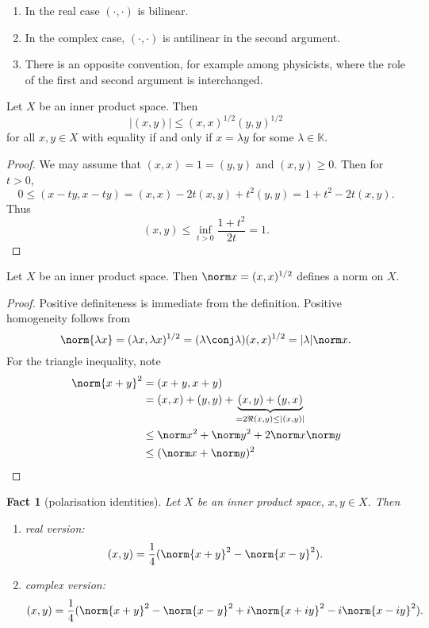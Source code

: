 \documentclass[a4paper]{article}
\newtheorem*{fact}{Fact}
\newcommand{\K}{{\mathbb{K}}} %
\begin{document}
\begin{remark}\leavevmode
  \begin{enumerate}
  \item In the real case \((\cdot, \cdot)\) is bilinear.
  \item In the complex case, \((\cdot, \cdot)\) is antilinear in the second argument.
  \item There is an opposite convention, for example among physicists, where the role of the first and second argument is interchanged.
  \end{enumerate}
\end{remark}

\begin{proposition}
  Let \(X\) be an inner product space. Then
  \[
    |(x, y)| \leq (x, x)^{1/2} (y, y)^{1/2}
  \]
  for all \(x, y \in X\) with equality if and only if \(x = \lambda y\) for some \(\lambda \in \K\).
\end{proposition}

\begin{proof}
  We may assume that \((x, x) = 1 = (y, y)\) and \((x, y) \geq 0\). Then for \(t > 0\),
  \[
    0 \leq (x - ty, x- ty) = (x, x) - 2t(x, y) + t^2(y, y) = 1 + t^2 - 2t(x, y).
  \]
  Thus
  \[
    (x, y) \leq \inf_{t > 0} \frac{1 + t^2}{2t} = 1.
  \]
\end{proof}

\begin{corollary}
  Let \(X\) be an inner product space. Then \(\norm x = (x, x)^{1/2}\) defines a norm on \(X\).
\end{corollary}

\begin{proof}
  Positive definiteness is immediate from the definition. Positive homogeneity follows from
  \[
    \norm{\lambda x} = (\lambda x, \lambda x)^{1/2} = (\lambda \conj \lambda) (x, x)^{1/2} = |\lambda| \norm x.
  \]
  For the triangle inequality, note
  \begin{align*}
    \norm{x + y}^2
    &= (x + y, x + y) \\
    &= (x, x) + (y, y) + \underbrace{(x, y) + (y, x)}_{= 2 \Re(x, y) \leq |(x, y)|} \\
    &\leq \norm x^2 + \norm y^2 + 2 \norm x \norm y \\
    &\leq (\norm x + \norm y)^2
  \end{align*}
\end{proof}

\begin{fact}[polarisation identities]
  Let \(X\) be an inner product space, \(x, y \in X\). Then
  \begin{enumerate}
  \item real version:
    \[
      (x, y) = \frac{1}{4} (\norm{x + y}^2 - \norm{x - y}^2).
    \]
  \item complex version:
    \[
      (x, y) = \frac{1}{4} (\norm{x + y}^2 - \norm{x - y}^2 + i \norm {x + iy}^2 - i \norm{x - iy}^2).
    \]
  \end{enumerate}
\end{fact}
\end{document}

